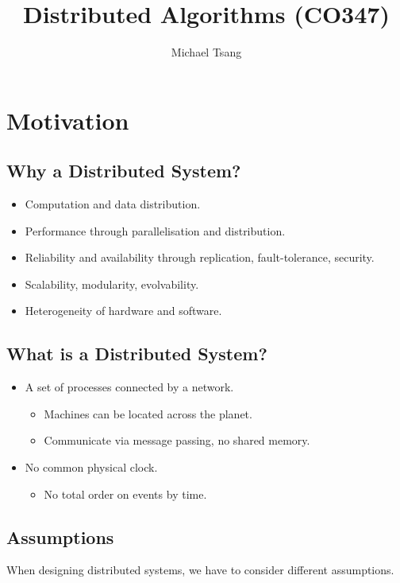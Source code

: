 \documentclass[11pt]{article}
\title{Distributed Algorithms (CO347)}
\author{Michael Tsang}
\begin{document}
\maketitle
\section{Motivation}
\subsection{Why a Distributed System?}
\begin{itemize}
  \item Computation and data distribution.
  \item Performance through parallelisation and distribution.
  \item Reliability and availability through replication, fault-tolerance, security.
  \item Scalability, modularity, evolvability.
  \item Heterogeneity of hardware and software.
\end{itemize}

\subsection{What is a Distributed System?}
\begin{itemize}
  \item A set of processes connected by a network.
    \begin{itemize}
      \item Machines can be located across the planet.
      \item Communicate via message passing, no shared memory.
    \end{itemize}
  \item No common physical clock.
    \begin{itemize}
      \item No total order on events by time.
    \end{itemize}
\end{itemize}

\subsection{Assumptions}
When designing distributed systems, we have to consider different assumptions.
\end{document}
